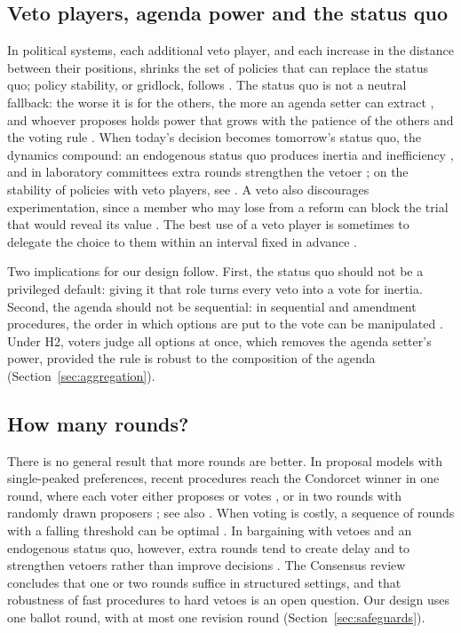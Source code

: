 \subsection{Veto players, agenda power and the status quo}

In political systems, each additional veto player, and each increase in the distance between their
positions, shrinks the set of policies that can replace the status quo; policy stability, or gridlock,
follows \citep{Tsebelis1995,Tsebelis2002}. The status quo is not a neutral fallback: the worse it is for
the others, the more an agenda setter can extract \citep{RomerRosenthal1978}, and whoever proposes holds
power that grows with the patience of the others and the voting rule \citep{BaronFerejohn1989,Harrington1990}.
When today's decision becomes tomorrow's status quo, the dynamics compound: an endogenous status quo
produces inertia and inefficiency \citep{DziudaLoeper2016,AnesiSeidmann2015}, and in laboratory
committees extra rounds strengthen the vetoer \citep{Nunnari2021}; on the stability of policies with
veto players, see \citet{AnesiDuggan2017}. A veto also
discourages experimentation, since a member who may lose from a reform can block the trial that would
reveal its value \citep{AnesiBowen2021}. The best use of a veto player is sometimes to delegate the
choice to them within an interval fixed in advance \citep{KartikKleinerVanWeelden2021}.

Two implications for our design follow. First, the status quo should not be a privileged default:
giving it that role turns every veto into a vote for inertia. Second, the agenda should not be
sequential: in sequential and amendment procedures, the order in which options are put to the vote can be
manipulated \citep{McKelvey1976,BarberaGerber2017}. Under H2, voters judge all options at once, which
removes the agenda setter's power, provided the rule is robust to the composition of the agenda
(Section~\ref{sec:aggregation}).

\subsection{How many rounds?}

There is no general result that more rounds are better. In proposal models with single-peaked
preferences, recent procedures reach the Condorcet winner in one round, where each voter either proposes
or votes \citep{Gersbach2025propose}, or in two rounds with randomly drawn proposers
\citep{GersbachValkanova2024}; see also \citet{Gersbach2024forms}. When voting is costly, a sequence of
rounds with a falling threshold can be optimal \citep{Bognar2015}. In bargaining with vetoes and an
endogenous status quo, however, extra rounds tend to create delay and to strengthen vetoers rather than
improve decisions \citep{Nunnari2021,DziudaLoeper2016}. The Consensus review concludes that one or two
rounds suffice in structured settings, and that robustness of fast procedures to hard vetoes is an open
question. Our design uses one ballot round, with at most one revision round (Section~\ref{sec:safeguards}).


